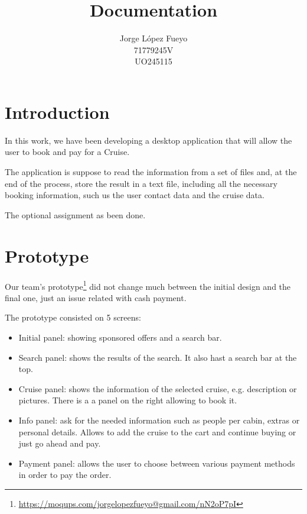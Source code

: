 \documentclass[11pt]{article}
\title{Documentation}
\author{Jorge López Fueyo \\ 71779245V \\ UO245115}
\begin{document}
	
   \maketitle
   \newpage
     
   \section{Introduction}
   
   In this work, we have been developing a desktop application that will allow the user to book and pay for a Cruise.

   The application is suppose to read the information from a set of files and, at the end of the process, store the result in a text file, including all the necessary booking information, such us the user contact data and the cruise data.
   
   The optional assignment as been done.
   
   \section{Prototype}
   Our team's prototype\footnote{\url{https://moqups.com/jorgelopezfueyo@gmail.com/nN2oP7pI}} did not change much between the initial design and the final one, just an issue related with cash payment.
   
   The prototype consisted on 5 screens:
   \begin{itemize}
	   	\item Initial panel: showing sponsored offers and a search bar.
	   	\item Search panel: shows the results of the search. It also hast a search bar at the top.
	   	\item Cruise panel: shows the information of the selected cruise, e.g. description or pictures. There is a a panel on the right allowing to book it.
	   	\item Info panel: ask for the needed information such as people per cabin, extras or personal details. Allows to add the cruise to the cart and continue buying or just go ahead and pay.
	   	\item Payment panel: allows the user to choose between various payment methods in order to pay the order. 
   \end{itemize}
   
\end{document}
